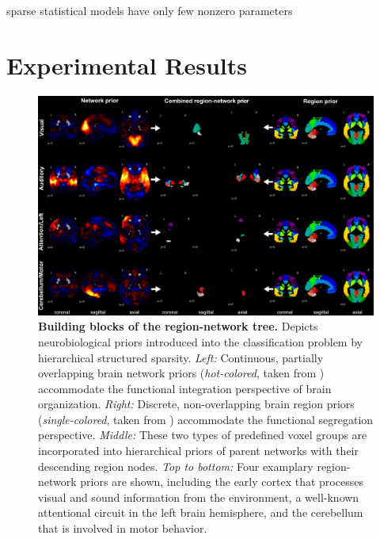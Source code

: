 \documentclass{article} %
\begin{document}
sparse statistical models have only few nonzero parameters








\section{Experimental Results}


\begin{figure}
\begin{centering}
\includegraphics[width=1.00\textwidth]{figures/reg_net_prior.pdf}
\end{centering}
\vspace{-0.6cm}
\caption{\textbf{Building blocks of the region-network tree.}
Depicts neurobiological priors introduced into the classification problem 
by hierarchical structured sparsity.
\textit{Left:} Continuous, partially overlapping brain network priors
(\textit{hot-colored}, taken from \cite{smith2009})
accommodate the functional integration
perspective of brain organization.
\textit{Right:} Discrete, non-overlapping brain region priors
(\textit{single-colored}, taken from \cite{crad12})
accommodate the functional segregation perspective.
\textit{Middle:} These two types of predefined voxel groups are incorporated
into hierarchical priors of parent networks with their
descending region nodes.
\textit{Top to bottom:} Four examplary region-network priors
are shown, including
the early cortex that processes
visual and sound information from the environment,
a well-known attentional circuit in the left brain hemisphere,
and
the cerebellum that is involved in motor behavior.
}
\label{fig_priors}
\end{figure}
\end{document}
